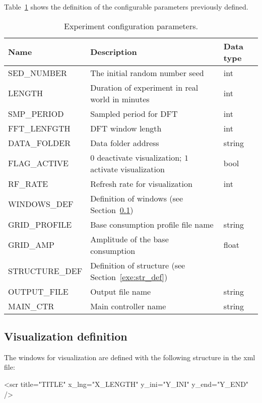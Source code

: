 %
Table~\ref{tab:exp_conf} shows the definition of the configurable parameters previously defined. 
%
\begin{table}[h]
	\begin{center}	
	\begin{tabular}{|m{3.5cm}|m{10cm}|m{1cm}|} \hline		
		{\bf Name} 	& {\bf Description} 					   & {\bf Data type} 	\\ \hline
		SED\_NUMBER	& The initial random number seed 			   & int		\\ \hline
		LENGTH		& Duration of experiment in real world in minutes	   & int		\\ \hline
		SMP\_PERIOD	& Sampled period for DFT				   & int		\\ \hline
		FFT\_LENFGTH	& DFT window length					   & int		\\ \hline
		DATA\_FOLDER	& Data folder address					   & string		\\ \hline
		FLAG\_ACTIVE	& $0$ deactivate visualization; $1$ activate visualization & bool		\\ \hline
		RF\_RATE	& Refresh rate for visualization			   & int		\\ \hline
		WINDOWS\_DEF    & Definition of windows (see Section~\ref{exe:visu_def})   &			\\ \hline
		GRID\_PROFILE	& Base consumption profile file name			   & string		\\ \hline
		GRID\_AMP	& Amplitude of the base consumption			   & float		\\ \hline
		STRUCTURE\_DEF	& Definition of structure (see Section~\ref{exe:str_def})  & 			\\ \hline
		OUTPUT\_FILE	& Output file name					   & string		\\ \hline
		MAIN\_CTR	& Main controller name					   & string		\\ \hline	
	\end{tabular}
	\caption{Experiment configuration parameters.}
	\label{tab:exp_conf}
	\end{center}
\end{table}


%
\subsection{Visualization definition}
\label{exe:visu_def}

%
The windows for visualization are defined with the following structure in the xml file:
%
\begin{code}
	<scr 
		title="TITLE"  
		x_lng="X_LENGTH" 
		y_ini="Y_INI" 
		y_end="Y_END"
	/>	
\end{code}

